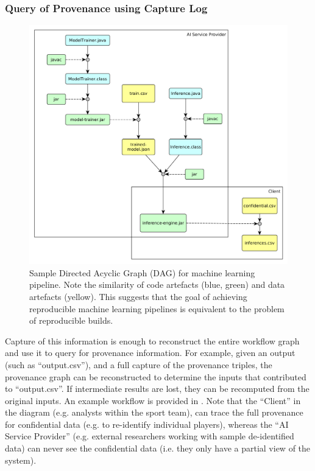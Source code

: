 \subsubsection{Query of Provenance using Capture Log}

\begin{figure}[htbp]
\centering
\includegraphics[width=\linewidth]{figs/dag/ml-build.png}
\caption{Sample Directed Acyclic Graph (DAG) for machine learning pipeline. Note the similarity of code artefacts (blue, green) and data artefacts (yellow). This suggests that the goal of achieving reproducible machine learning pipelines is equivalent to the problem of reproducible builds.}
\label{fig:ml-build}
\end{figure}

Capture of this information is enough to reconstruct the entire workflow graph and use it to query for provenance information. For example, given an output (such as ``output.csv''), and a full capture of the provenance triples, the provenance graph can be reconstructed to determine the inputs that contributed to ``output.csv''. If intermediate results are lost, they can be recomputed from the original inputs. An example workflow is provided in . Note that the ``Client'' in the diagram (e.g. analysts within the sport team), can trace the full provenance for confidential data (e.g. to re-identify individual players), whereas the ``AI Service Provider'' (e.g. external researchers working with sample de-identified data) can never see the confidential data (i.e. they only have a partial view of the system).

